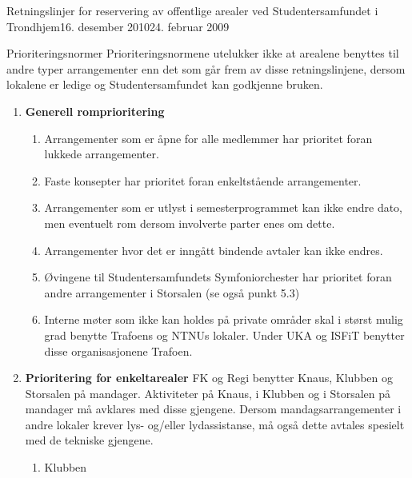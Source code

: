 \begin{instruks}{Retningslinjer for reservering av offentlige arealer
    ved Studentersamfundet i Trondhjem}{16. desember 2010}{24. februar 2009}
    \begin{instruksledd}{Prioriteringsnormer}
        Prioriteringsnormene utelukker ikke at arealene benyttes til andre typer
        arrangementer enn det som går frem av disse
        retningslinjene, dersom lokalene er ledige og Studentersamfundet kan godkjenne
        bruken.
        \begin{enumerate}
            \item \textbf{Generell romprioritering}
                \begin{enumerate}
                    \item Arrangementer som er åpne for alle medlemmer har prioritet
                        foran lukkede arrangementer.
                    \item Faste konsepter har prioritet foran enkeltstående
                        arrangementer.
                    \item Arrangementer som er utlyst i semesterprogrammet kan ikke
                        endre dato, men eventuelt rom dersom
                        involverte parter enes om dette.
                    \item Arrangementer hvor det er inngått bindende avtaler kan ikke
                        endres.
                    \item Øvingene til Studentersamfundets Symfoniorchester har
                        prioritet foran andre arrangementer i Storsalen (se
                        også punkt 5.3)
                    \item Interne møter som ikke kan holdes på private områder skal i
                        størst mulig grad benytte Trafoens og NTNUs
                        lokaler. Under UKA og ISFiT benytter disse organisasjonene
                        Trafoen.
                \end{enumerate}
            \item \textbf{ Prioritering for enkeltarealer}
                FK og Regi benytter Knaus, Klubben og Storsalen på mandager.
                Aktiviteter på Knaus, i Klubben og i Storsalen på
                mandager må avklares med disse gjengene. Dersom mandagsarrangementer i
                andre lokaler krever lys- og/eller
                lydassistanse, må også dette avtales spesielt med de tekniske
                gjengene.
                \begin{enumerate}
                    \item Klubben
                        \begin{enumerate}

\end{enumerate}
\end{enumerate}
\end{enumerate}
\end{instruksledd}
\end{instruks}
